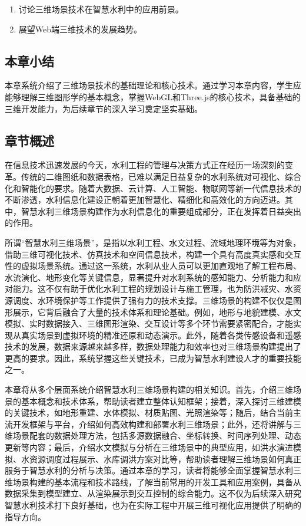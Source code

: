 \begin{enumerate}
\def\labelenumi{\arabic{enumi}.}
\setcounter{enumi}{6}
\tightlist
\item
  讨论三维场景技术在智慧水利中的应用前景。
\item
  展望Web端三维技术的发展趋势。
\end{enumerate}

\subsection{本章小结}\label{ux672cux7ae0ux5c0fux7ed3}

本章系统介绍了三维场景技术的基础理论和核心技术。通过学习本章内容，学生应能够理解三维图形学的基本概念，掌握WebGL和Three.js的核心技术，具备基础的三维开发能力，为后续章节的深入学习奠定坚实基础。

\subsection{章节概述}\label{ux7ae0ux8282ux6982ux8ff0}

在信息技术迅速发展的今天，水利工程的管理与决策方式正在经历一场深刻的变革。传统的二维图纸和数据表格，已难以满足日益复杂的水利系统对可视化、综合化和智能化的要求。随着大数据、云计算、人工智能、物联网等新一代信息技术的不断渗透，水利信息化建设正朝着更加智慧化、精细化和高效化的方向迈进。其中，智慧水利三维场景构建作为水利信息化的重要组成部分，正在发挥着日益突出的作用。

所谓``智慧水利三维场景''，是指以水利工程、水文过程、流域地理环境等为对象，借助三维可视化技术、仿真技术和空间信息技术，构建一个具有高度真实感和交互性的虚拟场景系统。通过这一系统，水利从业人员可以更加直观地了解工程布局、水流演化、地形变化等关键信息，显著提升对水利系统的感知能力、分析能力和应对能力。这不仅有助于优化水利工程的规划设计与施工管理，也为防洪减灾、水资源调度、水环境保护等工作提供了强有力的技术支撑。三维场景的构建不仅仅是图形展示，它背后融合了大量的技术体系和理论基础。例如，地形与地貌建模、水文模拟、实时数据接入、三维图形渲染、交互设计等多个环节需要紧密配合，才能实现从真实场景到虚拟环境的精准还原和动态演示。此外，随着各类传感设备和遥感技术的发展，数据来源越来越多样，数据处理能力和效率也对三维场景构建提出了更高的要求。因此，系统掌握这些关键技术，已成为智慧水利建设人才的重要技能之一。

本章将从多个层面系统介绍智慧水利三维场景构建的相关知识。首先，介绍三维场景的基本概念和技术体系，帮助读者建立整体认知框架；接着，深入探讨三维建模的关键技术，如地形重建、水体模拟、材质贴图、光照渲染等；随后，结合当前主流开发框架与平台，介绍如何高效构建和部署水利三维场景；此外，还将讲解与三维场景配套的数据处理方法，包括多源数据融合、坐标转换、时间序列处理、动态更新等内容；最后，介绍水文模拟与分析在三维场景中的典型应用，如洪水演进模拟、水资源调度过程展示、水库调洪方案对比等，帮助读者理解三维场景如何真正服务于智慧水利的分析与决策。通过本章的学习，读者将能够全面掌握智慧水利三维场景构建的基本流程和技术路线，了解当前常用的开发工具和应用案例，具备从数据采集到模型建立、从渲染展示到交互控制的综合能力。这不仅为后续深入研究智慧水利技术打下良好基础，也为在实际工程中开展三维可视化应用提供了明确的指导方向。

